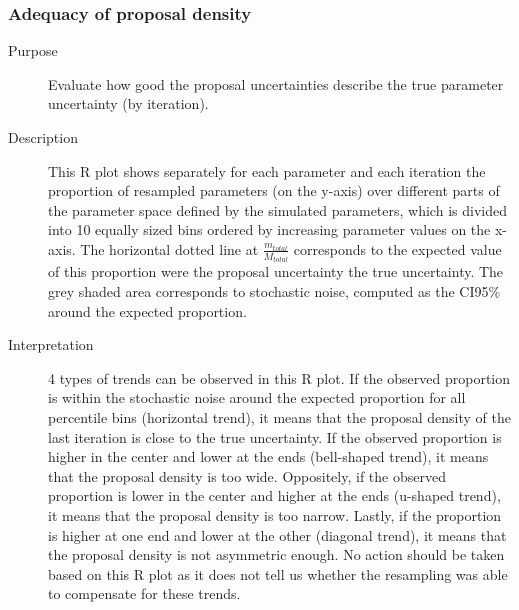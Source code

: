 \subsubsection{Adequacy of proposal density}
\begin{description}
\item[Purpose] Evaluate how good the proposal uncertainties describe the true parameter uncertainty (by iteration).
\item[Description] This R plot shows separately for each parameter and each iteration the proportion of resampled parameters (on the y-axis) over different parts of the parameter space defined by the simulated parameters, which is divided into 10 equally sized bins ordered by increasing parameter values on the x-axis.
The horizontal dotted line at $\frac{m_{total}}{M_{total}}$
corresponds to the expected value of this proportion were the proposal uncertainty the true uncertainty. The grey shaded area corresponds to stochastic noise, computed as the CI95\% around the expected proportion.
\item[Interpretation] 4 types of trends can be observed in this R plot. If the observed proportion is within the stochastic noise around the expected proportion for all percentile bins (horizontal trend), it means that the proposal density of the last iteration is close to the true uncertainty. If the observed proportion is higher in the center and lower at the ends (bell-shaped trend), it means that the proposal density is too wide. Oppositely, if the observed proportion is lower in the center and higher at the ends (u-shaped trend), it means that the proposal density is too narrow. Lastly, if the proportion is higher at one end and lower at the other (diagonal trend), it means that the proposal density is not asymmetric enough. No action should be taken based on this R plot as it does not tell us whether the resampling was able to compensate for these trends.
\end{description}

